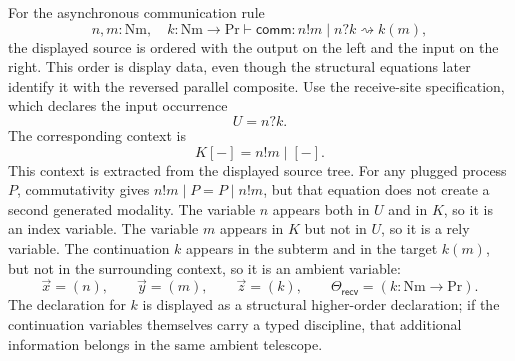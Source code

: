 \documentclass[11pt]{article}
\newcommand{\Proc}{\mathrm{Pr}}
\newcommand{\Nm}{\mathrm{Nm}}
\newcommand{\rw}{\rightsquigarrow}
\newcommand{\comm}{\mathsf{comm}}
\newcommand{\hole}{[-]}
\begin{document}
For the asynchronous communication rule
\[
  n,m:\Nm,
  \quad
  k:\Nm\to\Proc
  \vdash
  \comm:n!m\mid n?k\rw k(m),
\]
the displayed source is ordered with the output on the left and the input on the right.  This order is display data, even though the structural equations later identify it with the reversed parallel composite.  Use the receive-site specification, which declares the input occurrence
\[
  U=n?k.
\]
The corresponding context is
\[
  K[-]=n!m\mid\hole.
\]
This context is extracted from the displayed source tree.  For any plugged process \(P\), commutativity gives \(n!m\mid P=P\mid n!m\), but that equation does not create a second generated modality. The variable \(n\) appears both in \(U\) and in \(K\), so it is an index variable. The variable \(m\) appears in \(K\) but not in \(U\), so it is a rely variable. The continuation \(k\) appears in the subterm and in the target \(k(m)\), but not in the surrounding context, so it is an ambient variable:
\[
  \vec{x}=(n),
  \qquad
  \vec{y}=(m),
  \qquad
  \vec{z}=(k),
  \qquad
  \Theta_{\mathsf{recv}}=(k:\Nm\to\Proc).
\]
The declaration for \(k\) is displayed as a structural higher-order declaration; if the continuation variables themselves carry a typed discipline, that additional information belongs in the same ambient telescope.
\end{document}
